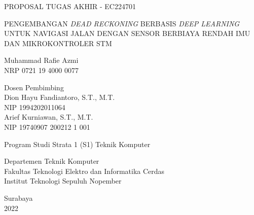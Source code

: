 \begin{large}
  PROPOSAL TUGAS AKHIR - EC224701
\end{large}

\vspace{\fill}

\begin{spacing}{1.5}
  \begin{Large}
    PENGEMBANGAN \emph{DEAD RECKONING} BERBASIS \emph{DEEP LEARNING}  
    UNTUK NAVIGASI JALAN DENGAN SENSOR BERBIAYA RENDAH IMU
    DAN MIKROKONTROLER STM 
  \end{Large}
\end{spacing}

\vspace{\fill}

\begin{large}
  Muhammad Rafie Azmi \\
  \textmd{NRP 0721 19 4000 0077}
\end{large}

\vspace{\fill}

\begin{large}
  \textmd{Dosen Pembimbing} \\
  Dion Hayu Fandiantoro, S.T., M.T. \\
  \textmd{NIP 1994202011064} \\
  Arief Kurniawan, S.T., M.T. \\
  \textmd{NIP 19740907 200212 1 001}
\end{large}

\vspace{\fill}

Program Studi Strata 1 (S1) Teknik Komputer \\

\mdseries

Departemen Teknik Komputer \\
Fakultas Teknologi Elektro dan Informatika Cerdas \\
Institut Teknologi Sepuluh Nopember

Surabaya \\
2022
